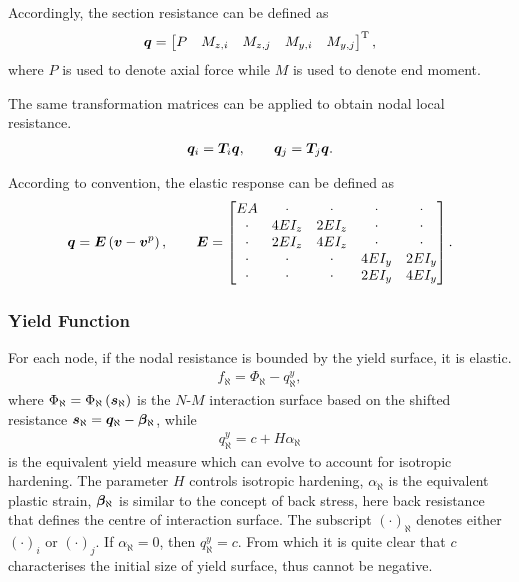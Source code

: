 Accordingly, the section resistance can be defined as
\begin{gather}
\bm{q}=\begin{bmatrix}
P&M_{z,i}&M_{z,j}&M_{y,i}&M_{y,j}
\end{bmatrix}^{\mathrm{T}},
\end{gather}
where $P$ is used to denote axial force while $M$ is used to denote end moment.

The same transformation matrices can be applied to obtain nodal local resistance.
\begin{gather}
\bm{q}_i=\bm{T}_i\bm{q},\qquad
\bm{q}_j=\bm{T}_j\bm{q}.
\end{gather}

According to convention, the elastic response can be defined as
\begin{gather}
\bm{q}=\bm{E}\left(\bm{v}-\bm{v}^p\right),\qquad\bm{E}=\begin{bmatrix}
EA&\cdot&\cdot&\cdot&\cdot\\
\cdot&4EI_z&2EI_z&\cdot&\cdot\\
\cdot&2EI_z&4EI_z&\cdot&\cdot\\
\cdot&\cdot&\cdot&4EI_y&2EI_y\\
\cdot&\cdot&\cdot&2EI_y&4EI_y
\end{bmatrix}.
\end{gather}
\subsubsection{Yield Function}
For each node, if the nodal resistance is bounded by the yield surface, it is elastic.
\begin{gather}
f_\aleph=\Phi_\aleph-q^y_\aleph,
\end{gather}
where $\Phi_\aleph=\Phi_\aleph\left(\bm{s}_\aleph\right)$ is the $N$-$M$ interaction surface based on the shifted resistance $\bm{s}_\aleph=\bm{q}_\aleph-\bm{\beta}_\aleph$, while
\begin{gather}
q^y_\aleph=c+H\alpha_\aleph
\end{gather}
is the equivalent yield measure which can evolve to account for isotropic hardening. The parameter $H$ controls isotropic hardening, $\alpha_\aleph$ is the equivalent plastic strain, $\bm{\beta}_\aleph$ is similar to the concept of back stress, here back resistance that defines the centre of interaction surface. The subscript $\left(\cdot\right)_\aleph$ denotes either $\left(\cdot\right)_i$ or $\left(\cdot\right)_j$. If $\alpha_\aleph=0$, then $q^y_\aleph=c$. From which it is quite clear that $c$ characterises the initial size of yield surface, thus cannot be negative.

